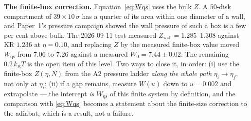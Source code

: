 \documentclass[11pt,a4paper]{article}
\newcommand{\kT}{k_{\mathrm B}T}
\begin{document}
\textbf{The finite-box correction.} Equation~\eqref{eq:Wqs} uses the bulk $Z$. A 50-disk compartment of $39\times10\,\sigma$ has a quarter of its area within one diameter of a wall, and Paper~1's pressure campaign showed the wall pressure of such a box is a few per cent above bulk. The 2026-09-11 test measured $Z_{\mathrm{wall}} = 1.285$--$1.308$ against KR $1.236$ at $\eta = 0.10$, and replacing $Z$ by the measured finite-box value moved $W_{\mathrm{qs}}$ from $7.06$ to $7.26$ against a measured $W_0 = 7.44 \pm 0.02$. The remaining $0.2\,\kT$ is the open item of this level. Two ways to close it, in order: (i) use the finite-box $Z(\eta, N)$ from the A2 pressure ladder \emph{along the whole path} $\eta_i \to \eta_f$, not only at $\eta_i$; (ii) if a gap remains, measure $W(u)$ down to $u = 0.002$ and extrapolate --- the intercept \emph{is} $W_{\mathrm{qs}}$ of this finite system by definition, and the comparison with \eqref{eq:Wqs} becomes a statement about the finite-size correction to the adiabat, which is a result, not a failure.
\end{document}
